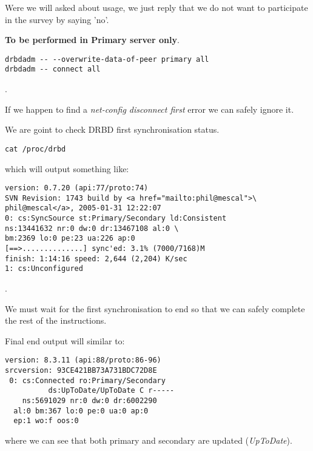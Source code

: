 Were we will asked about usage, we just reply that we do not want to participate in the survey by saying 'no'.

\textbf{To be performed in Primary server only}.
\begin{verbatim}
drbdadm -- --overwrite-data-of-peer primary all
drbdadm -- connect all
\end{verbatim}
.

If we happen to find a \textit{net-config disconnect first} error we can safely ignore it.

We are goint to check DRBD first synchronisation status.
\begin{verbatim}
cat /proc/drbd
\end{verbatim}
which will output something like:
\begin{verbatim}
version: 0.7.20 (api:77/proto:74)
SVN Revision: 1743 build by <a href="mailto:phil@mescal">\
phil@mescal</a>, 2005-01-31 12:22:07
0: cs:SyncSource st:Primary/Secondary ld:Consistent
ns:13441632 nr:0 dw:0 dr:13467108 al:0 \
bm:2369 lo:0 pe:23 ua:226 ap:0
[==>..............] sync'ed: 3.1% (7000/7168)M
finish: 1:14:16 speed: 2,644 (2,204) K/sec
1: cs:Unconfigured
\end{verbatim}
.

We must wait for the first synchronisation to end so that we can safely complete the rest of the instructions.

Final end output will similar to:
\begin{verbatim}
version: 8.3.11 (api:88/proto:86-96)
srcversion: 93CE421BB73A731BDC72D8E 
 0: cs:Connected ro:Primary/Secondary
          ds:UpToDate/UpToDate C r-----
    ns:5691029 nr:0 dw:0 dr:6002290
  al:0 bm:367 lo:0 pe:0 ua:0 ap:0
  ep:1 wo:f oos:0
\end{verbatim}
where we can see that both primary and secondary are updated (\textit{UpToDate}).
